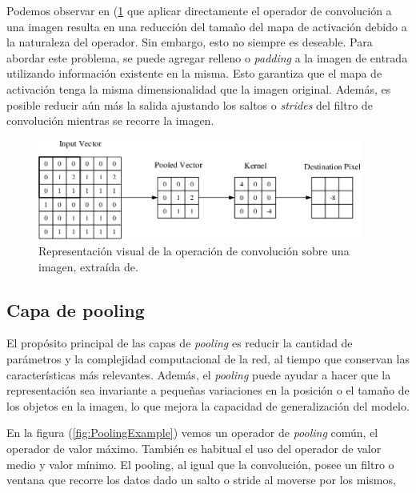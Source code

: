 Podemos observar en (\ref{fig:ConvolutionalRepresentation} que aplicar directamente 
el operador de convolución a una imagen resulta en una reducción del tamaño del mapa 
de activación debido a la naturaleza del operador. 
Sin embargo, esto no siempre es deseable. 
Para abordar este problema, se puede agregar relleno o \emph{padding} a la imagen 
de entrada utilizando información existente en la misma. 
Esto garantiza que el mapa de activación tenga la misma dimensionalidad que 
la imagen original. Además, es posible reducir aún más la salida ajustando 
los saltos o \emph{strides} del filtro de convolución mientras se recorre la imagen.

\begin{figure}[htp]
  \begin{center}
    \includegraphics[width=0.95\textwidth]{imagenes/chapter2/ConvolutionalRepresentation.png}
  \end{center}
  \caption{Representación visual de la operación de convolución sobre una imagen, extraída de\cite{ConvolutionalRepresentation}.
  }
  \label{fig:ConvolutionalRepresentation}
\end{figure}

\subsection{Capa de pooling} 
El propósito principal de las capas de \emph{pooling} es reducir la cantidad de parámetros 
y la complejidad computacional de la red, al tiempo que conservan las características 
más relevantes. Además, el \emph{pooling} puede ayudar a hacer que la representación sea 
invariante a pequeñas variaciones en la posición o el tamaño de los objetos en la 
imagen, lo que mejora la capacidad de generalización del modelo.

En la figura (\ref{fig:PoolingExample}) vemos un operador de \emph{pooling} común,
el operador de valor máximo. También es habitual el uso del operador de valor medio y
valor mínimo.
El pooling, al igual que la convolución, posee un filtro o ventana que recorre
los datos dado un salto o stride al moverse por los mismos,

